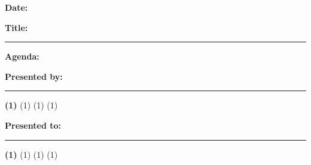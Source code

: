 {   \vspace{0.35in}

   \textbf{Date:}  \@docDate \hfill {} 

   \textbf{Title:} \@docTitle

   \vspace{12pt} \hrule height 2pt \vspace{6pt}

   \textbf{\large Agenda:}

   \@docAbstract
   
   \vfill
   
   \begin{minipage}{.48\textwidth}%
      \textbf{Presented by:} \vspace{2mm}
      
      \vspace{6pt} \hrule \vspace{5pt}
      \small\textbf{\docAuthorName(1)} \hfill \break
      \docAuthorPosition(1) \hfill \break
      \docAuthorOrganization(1) \hfill \break
      \docAuthorLocation(1) \hfill 
      \end{minipage}%
      \begin{minipage}{.01\textwidth}%
      \hfill
   \end{minipage}%
   \begin{minipage}{.48\textwidth}%
      \textbf{Presented to:} \vspace{2mm}
      
      \vspace{9.5pt} \hrule \vspace{5pt}
      \small\textbf{\docApproverName(1)} \hfill \break
      \docApproverPosition(1) \hfill \break
      \docApproverOrganization(1) \hfill \break
      \docApproverLocation(1) \hfill 
      \end{minipage}%
      \begin{minipage}{.01\textwidth}%
      \hfill
   \end{minipage}%
   
   \vspace{\baselineskip}

   \begin{center}
      \printExportFooter
   \end{center}

   \vspace{0.25in} 

}
